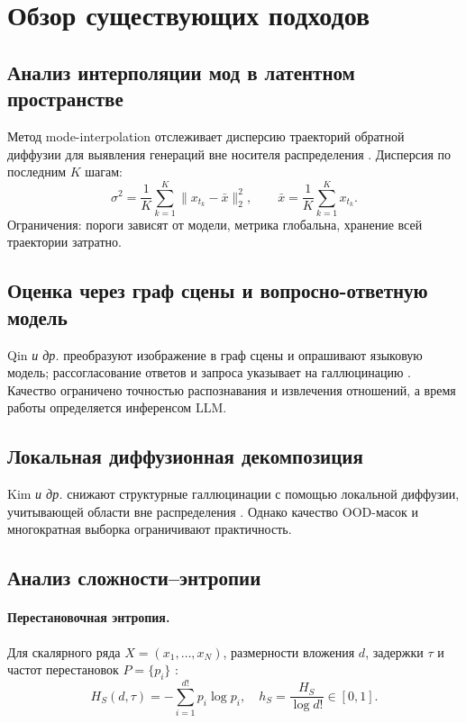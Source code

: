 \documentclass[14pt]{extarticle}
\theoremstyle{plain}
\numberwithin{equation}{section}
\numberwithin{figure}{section}
\numberwithin{table}{section}
\begin{document}
\section{Обзор существующих подходов}\label{sec:related}

\subsection{Анализ интерполяции мод в латентном пространстве}
Метод mode-interpolation отслеживает дисперсию траекторий обратной диффузии для
выявления генераций вне носителя распределения \citep{NEURIPS2024_f29369d1}.
Дисперсия по последним $K$ шагам:
\begin{equation}
\sigma^{2}= \frac{1}{K}\sum_{k=1}^{K}\bigl\lVert
x_{t_k}-\bar{x}\bigr\rVert_2^{2}, \qquad
\bar{x}=\frac{1}{K}\sum_{k=1}^{K}x_{t_k}.
\label{eq:traj_var}
\end{equation}
Ограничения: пороги зависят от модели, метрика глобальна, хранение всей
траектории затратно.

\subsection{Оценка через граф сцены и вопросно-ответную модель}
Qin \emph{и др.} преобразуют изображение в граф сцены и опрашивают языковую
модель; рассогласование ответов и запроса указывает на галлюцинацию
\citep{qin2024evaluatinghallucinationtexttoimagediffusion}. Качество ограничено
точностью распознавания и извлечения отношений, а время работы определяется
инференсом LLM.

\subsection{Локальная диффузионная декомпозиция}
Kim \emph{и др.} снижают структурные галлюцинации с помощью локальной диффузии,
учитывающей области вне распределения \citep{10.1007/978-3-031-73004-7_6}.
Однако качество OOD-масок и многократная выборка ограничивают практичность.

\subsection{Анализ сложности–энтропии}\label{sec:ce}

\paragraph{Перестановочная энтропия.}
Для скалярного ряда $X=(x_1,\dots,x_N)$, размерности вложения $d$, задержки
$\tau$ и частот перестановок $P=\{p_i\}$ \citep{bandt2002permutation}:
\begin{equation}
H_S(d,\tau)=-\sum_{i=1}^{d!}p_i\log p_i, \quad
h_S=\frac{H_S}{\log d!}\in[0,1].
\label{eq:perm_entropy}
\end{equation}
\end{document}
